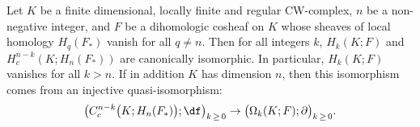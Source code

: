 \begin{theo}\label{thm:cell_poinca_lef}
Let $K$ be a finite dimensional, locally finite and regular CW-complex, $n$ be a non-negative integer, and $F$ be a dihomologic cosheaf on $K$ whose sheaves of local homology $H_q(F_*)$ vanish for all $q\neq n$. Then for all integers $k$, $H_k(K;F)$ and $H_c^{n-k}(K;H_n(F_*))$ are canonically isomorphic. In particular, $H_k(K;F)$ vanishes for all $k>n$. If in addition $K$ has dimension $n$, then this isomorphism comes from an injective quasi-isomorphism:
\begin{equation*}
\big(C^{n-k}_c\big(K;H_n(F_*)\big);\df\big)_{k\,\geq\,0}\rightarrow \big(\Omega_k(K;F);\partial\big)_{k\,\geq\,0}.
\end{equation*}
\end{theo}
